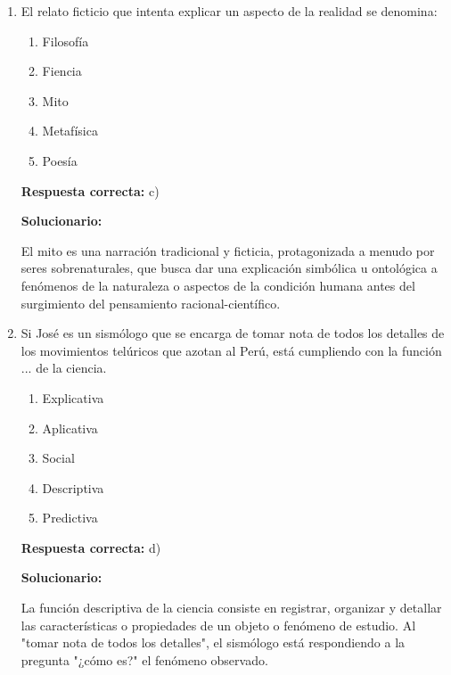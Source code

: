 \begin{enumerate}[resume]
	\vspace{6mm}
	
	\item El relato ficticio que intenta explicar un aspecto de la realidad se denomina:
	
	\begin{enumerate}[label=\alph*)]
		\item Filosofía
		\item Fiencia
		\item Mito
		\item Metafísica
		\item Poesía
	\end{enumerate}
	
	\textbf{Respuesta correcta:} c)
	
	\vspace{2mm}
	\textbf{Solucionario:}
	
	El mito es una narración tradicional y ficticia, protagonizada a menudo por seres sobrenaturales, que busca dar una explicación simbólica u ontológica a fenómenos de la naturaleza o aspectos de la condición humana antes del surgimiento del pensamiento racional-científico.
	
	\vspace{6mm}
	
	\item Si José es un sismólogo que se encarga de tomar nota de todos los detalles de los movimientos telúricos que azotan al Perú, está cumpliendo con la función ... de la ciencia.
	
	\begin{enumerate}[label=\alph*)]
		\item Explicativa
		\item Aplicativa
		\item Social
		\item Descriptiva
		\item Predictiva
	\end{enumerate}
	
	\textbf{Respuesta correcta:} d)
	
	\vspace{2mm}
	\textbf{Solucionario:}
	
	La función descriptiva de la ciencia consiste en registrar, organizar y detallar las características o propiedades de un objeto o fenómeno de estudio. Al "tomar nota de todos los detalles", el sismólogo está respondiendo a la pregunta "¿cómo es?" el fenómeno observado.
	
	\vspace{6mm}
	
\end{enumerate}



